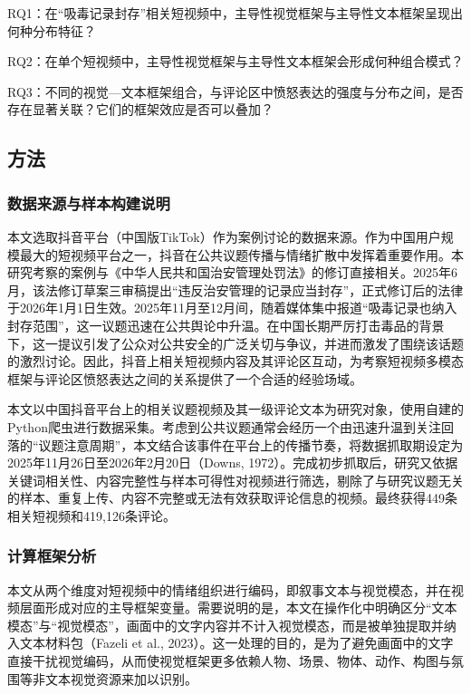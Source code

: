 \documentclass[
]{article}
\begin{document}
RQ1：在``吸毒记录封存''相关短视频中，主导性视觉框架与主导性文本框架呈现出何种分布特征？

RQ2：在单个短视频中，主导性视觉框架与主导性文本框架会形成何种组合模式？

RQ3：不同的视觉---文本框架组合，与评论区中愤怒表达的强度与分布之间，是否存在显著关联？它们的框架效应是否可以叠加？

\subsection{方法}\label{ux65b9ux6cd5}

\subsubsection{数据来源与样本构建说明}\label{ux6570ux636eux6765ux6e90ux4e0eux6837ux672cux6784ux5efaux8bf4ux660e}

本文选取抖音平台（中国版TikTok）作为案例讨论的数据来源。作为中国用户规模最大的短视频平台之一，抖音在公共议题传播与情绪扩散中发挥着重要作用。本研究考察的案例与《中华人民共和国治安管理处罚法》的修订直接相关。2025年6月，该法修订草案三审稿提出``违反治安管理的记录应当封存''，正式修订后的法律于2026年1月1日生效。2025年11月至12月间，随着媒体集中报道``吸毒记录也纳入封存范围''，这一议题迅速在公共舆论中升温。在中国长期严厉打击毒品的背景下，这一提议引发了公众对公共安全的广泛关切与争议，并进而激发了围绕该话题的激烈讨论。因此，抖音上相关短视频内容及其评论区互动，为考察短视频多模态框架与评论区愤怒表达之间的关系提供了一个合适的经验场域。

本文以中国抖音平台上的相关议题视频及其一级评论文本为研究对象，使用自建的Python爬虫进行数据采集。考虑到公共议题通常会经历一个由迅速升温到关注回落的``议题注意周期''，本文结合该事件在平台上的传播节奏，将数据抓取期设定为2025年11月26日至2026年2月20日（Downs,
1972）。完成初步抓取后，研究又依据关键词相关性、内容完整性与样本可得性对视频进行筛选，剔除了与研究议题无关的样本、重复上传、内容不完整或无法有效获取评论信息的视频。最终获得449条相关短视频和419,126条评论。

\subsubsection{计算框架分析}\label{ux8ba1ux7b97ux6846ux67b6ux5206ux6790}

本文从两个维度对短视频中的情绪组织进行编码，即叙事文本与视觉模态，并在视频层面形成对应的主导框架变量。需要说明的是，本文在操作化中明确区分``文本模态''与``视觉模态''，画面中的文字内容并不计入视觉模态，而是被单独提取并纳入文本材料包（Fazeli
et al.,
2023）。这一处理的目的，是为了避免画面中的文字直接干扰视觉编码，从而使视觉框架更多依赖人物、场景、物体、动作、构图与氛围等非文本视觉资源来加以识别。
\end{document}
